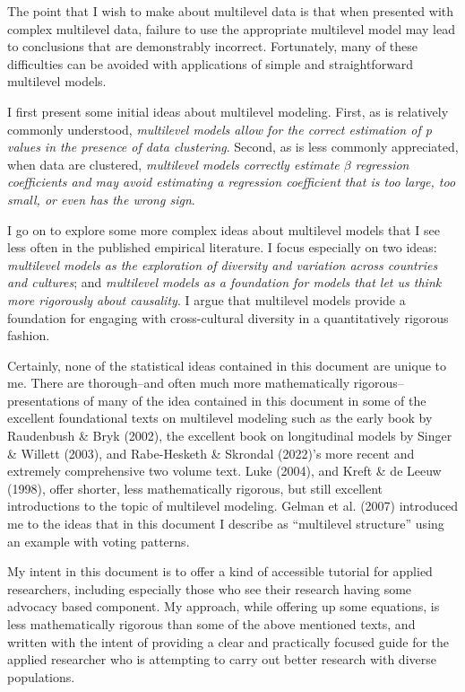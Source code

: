 \documentclass[
  letterpaper,
  DIV=11,
  numbers=noendperiod]{scrreprt}
\begin{document}
The point that I wish to make about multilevel data is that when
presented with complex multilevel data, failure to use the appropriate
multilevel model may lead to conclusions that are demonstrably
incorrect. Fortunately, many of these difficulties can be avoided with
applications of simple and straightforward multilevel models.

I first present some initial ideas about multilevel modeling. First, as
is relatively commonly understood, \emph{multilevel models allow for the
correct estimation of p values in the presence of data clustering}.
Second, as is less commonly appreciated, when data are clustered,
\emph{multilevel models correctly estimate \(\beta\) regression
coefficients and may avoid estimating a regression coefficient that is
too large, too small, or even has the wrong sign}.

I go on to explore some more complex ideas about multilevel models that
I see less often in the published empirical literature. I focus
especially on two ideas: \emph{multilevel models as the exploration of
diversity and variation across countries and cultures}; and
\emph{multilevel models as a foundation for models that let us think
more rigorously about causality}. I argue that multilevel models provide
a foundation for engaging with cross-cultural diversity in a
quantitatively rigorous fashion.

Certainly, none of the statistical ideas contained in this document are
unique to me. There are thorough--and often much more mathematically
rigorous--presentations of many of the idea contained in this document
in some of the excellent foundational texts on multilevel modeling such
as the early book by Raudenbush \& Bryk (2002), the excellent book on
longitudinal models by Singer \& Willett (2003), and Rabe-Hesketh \&
Skrondal (2022)'s more recent and extremely comprehensive two volume
text. Luke (2004), and Kreft \& de Leeuw (1998), offer shorter, less
mathematically rigorous, but still excellent introductions to the topic
of multilevel modeling. Gelman et al. (2007) introduced me to the ideas
that in this document I describe as ``multilevel structure'' using an
example with voting patterns.

My intent in this document is to offer a kind of accessible tutorial for
applied researchers, including especially those who see their research
having some advocacy based component. My approach, while offering up
some equations, is less mathematically rigorous than some of the above
mentioned texts, and written with the intent of providing a clear and
practically focused guide for the applied researcher who is attempting
to carry out better research with diverse populations.
\end{document}
